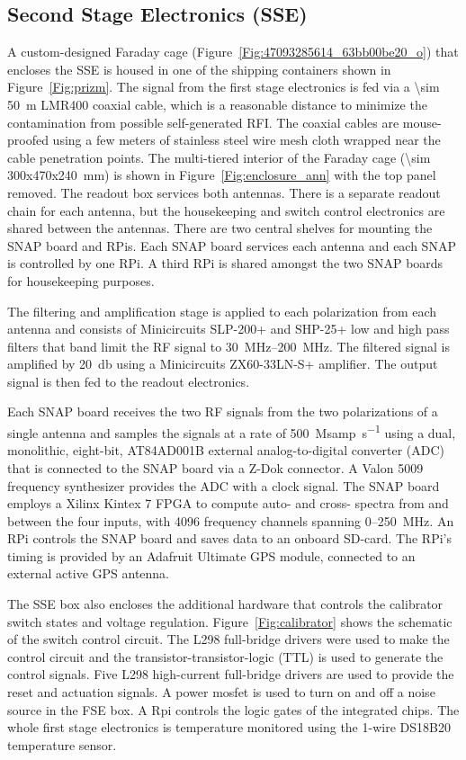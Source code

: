 \subsection{Second Stage Electronics (SSE)}

A custom-designed Faraday cage (Figure~\ref{Fig:47093285614_63bb00be20_o}) that encloses the SSE is housed in one of the shipping containers shown in Figure~\ref{Fig:prizm}. The signal from the first stage electronics is fed via a \SI{\sim 50}{\meter} LMR400 coaxial cable, which is a reasonable distance to minimize the contamination from possible self-generated RFI. The coaxial cables are mouse-proofed using a few meters of stainless steel wire mesh cloth wrapped near the cable penetration points. The multi-tiered interior of the Faraday cage (\SI{\sim 300x470x240}{\milli \meter}) is shown in Figure~\ref{Fig:enclosure_ann} with the top panel removed. The readout box services both antennas. There is a separate readout chain for each antenna, but the housekeeping and switch control electronics are shared between the antennas. There are two central shelves for mounting the SNAP board and RPis. Each SNAP board services each antenna and each SNAP is controlled by one RPi. A third RPi is shared amongst the two SNAP boards for housekeeping purposes.

The filtering and amplification stage is applied to each polarization from each antenna and consists of Minicircuits SLP-200+ and SHP-25+ low and high pass filters that band limit the RF signal to \SIrange{30}{200}{\mega \hertz}. The filtered signal is amplified by \SI{20}{\decibel} using a Minicircuits ZX60-33LN-S+ amplifier. The output signal is then fed to the readout electronics.

Each SNAP board receives the two RF signals from the two polarizations of a single antenna and samples the signals at a rate of \SI{500}{\mega samp\per \second} using a dual, monolithic, eight-bit, AT84AD001B external analog-to-digital converter (ADC) that is connected to the SNAP board via a Z-Dok connector. A Valon 5009 frequency synthesizer provides the ADC with a clock signal. The SNAP board employs a Xilinx Kintex 7 FPGA to compute auto- and cross- spectra from and between the four inputs, with 4096 frequency channels spanning 0--250~MHz. An RPi controls the SNAP board and saves data to an onboard SD-card. The RPi's timing is provided by an Adafruit Ultimate GPS module, connected to an external active GPS antenna.

The SSE box also encloses the additional hardware that controls the calibrator switch states and voltage regulation. Figure~\ref{Fig:calibrator} shows the schematic of the switch control circuit. The L298 full-bridge drivers were used to make the control circuit and the transistor-transistor-logic (TTL) is used to generate the control signals. Five L298 high-current full-bridge drivers are used to provide the reset and actuation signals. A power mosfet is used to turn on and off a noise source in the FSE box. A Rpi controls the logic gates of the integrated chips. The whole first stage electronics is temperature monitored using the 1-wire DS18B20 temperature sensor.

